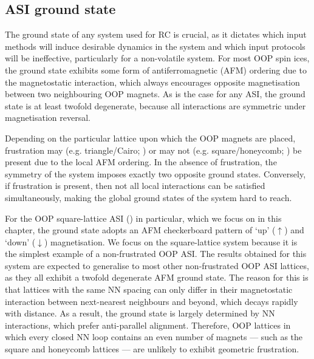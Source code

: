 \subsection{ASI ground state}
The ground state of any system used for RC is crucial, as it dictates which input methods will induce desirable dynamics in the system and which input protocols will be ineffective, particularly for a non-volatile system.
For most OOP spin ices, the ground state exhibits some form of antiferromagnetic (AFM) ordering due to the magnetostatic interaction, which always encourages opposite magnetisation between two neighbouring OOP magnets.
As is the case for any ASI, the ground state is at least twofold degenerate, because all interactions are symmetric under magnetisation reversal. \par
Depending on the particular lattice upon which the OOP magnets are placed, frustration may (e.g. triangle/Cairo; ) or may not (e.g. square/honeycomb; ) be present due to the local AFM ordering.
In the absence of frustration, the symmetry of the system imposes exactly two opposite ground states.
Conversely, if frustration is present, then not all local interactions can be satisfied simultaneously, making the global ground states of the system hard to reach. \par %
For the OOP square-lattice ASI () in particular, which we focus on in this chapter, the ground state adopts an AFM checkerboard pattern of `up' ($\uparrow$) and `down' ($\downarrow$) magnetisation.
We focus on the square-lattice system because it is the simplest example of a non-frustrated OOP ASI.
The results obtained for this system are expected to generalise to most other non-frustrated OOP ASI lattices, as they all exhibit a twofold degenerate AFM ground state.
The reason for this is that lattices with the same NN spacing can only differ in their magnetostatic interaction between next-nearest neighbours and beyond, which decays rapidly with distance.
As a result, the ground state is largely determined by NN interactions, which prefer anti-parallel alignment.
Therefore, OOP lattices in which every closed NN loop contains an even number of magnets --- such as the square and honeycomb lattices --- are unlikely to exhibit geometric frustration.

